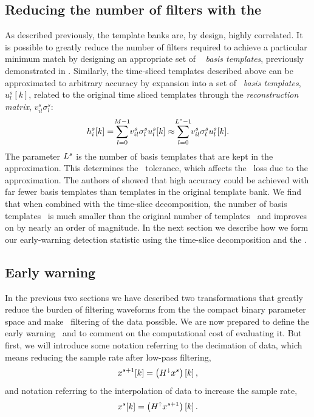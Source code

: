\subsection{Reducing the number of filters with the \SVD{}}

As described previously, the template banks are, by design, highly correlated.
It is possible to greatly reduce the number of filters required to achieve a
particular minimum match by designing an appropriate set of \SVD\ {\em
basis templates}, previously demonstrated
in \citet{Cannon:2010p10398}.  Similarly, the time-sliced templates described
above can be approximated to arbitrary accuracy by expansion into a set of
\SVD\ \emph{basis templates}, $u_l^s[k]$, related to the original time
sliced templates through the \emph{reconstruction matrix},
$v_{il}^s\sigma_l^s$:
%
\begin{equation}
h_i^s[k] = \sum_{\mathclap{l=0}}^{\mathclap{M-1}} v_{il}^s \sigma_l^s u_l^s[k] \approx \sum_{\mathclap{l=0}}^{\mathclap{L^s-1}} v_{il}^s \sigma_l^s u_l^s[k].
\label{eq:svddecomp}
\end{equation}
%
The parameter $L^s$ is the number of basis templates that are kept in
the approximation.  This determines the \SVD\ tolerance, which affects the
\SNR\ loss due to the approximation.  The authors of \citet{Cannon:2010p10398}
showed that high accuracy could be achieved with far fewer basis templates than
templates in the original template bank.  We find that when combined with the
time-slice decomposition, the number of basis templates \numsvdtmps\ is much
smaller than the original number of templates \numtmps\ and improves on
\citep{Cannon:2010p10398} by nearly an order of magnitude.  In the next section
we describe how we form our early-warning detection statistic using the time-slice
decomposition and the \SVD.

\subsection{Early warning \SNR }

In the previous two sections we have described two transformations that greatly
reduce the burden of filtering waveforms from the the compact binary parameter space and make \TD\
filtering of the data possible.  We are now prepared to define the early
warning \SNR\ and to comment on the computational cost of evaluating it.  But
first, we will introduce some notation referring to the decimation of data,
which means reducing the sample rate after low-pass filtering,
\begin{equation*}
\label{eq:decomp}
	x^{s+1}[k] = \left( H^\shortdownarrow x^s\right)[k] \,,
\end{equation*}
and notation referring to the interpolation of data to increase the sample rate,
\begin{equation*}
	x^{s}[k] = \left( H^\shortuparrow x^{s+1}\right)[k] \,.
\end{equation*}

